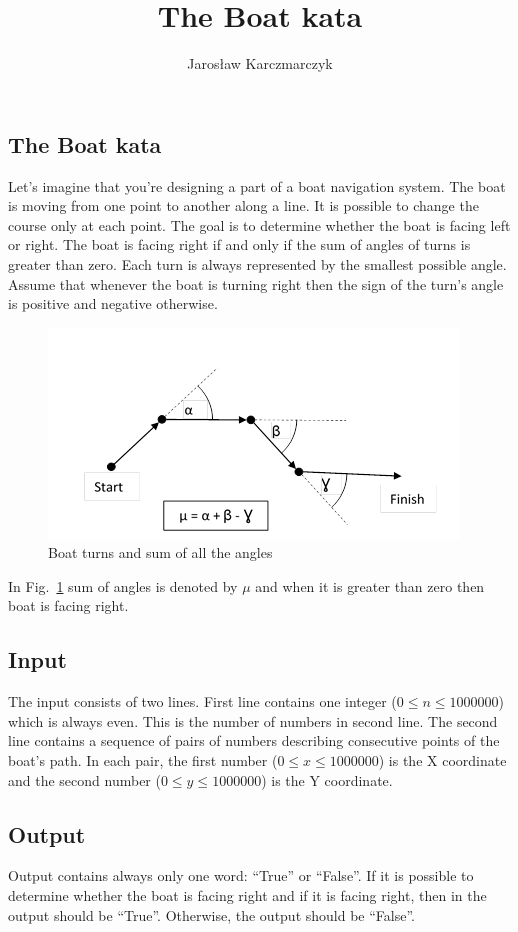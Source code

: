\documentclass{article}
\title{The Boat kata}
\author{Jarosław Karczmarczyk}
\date{}
\begin{document}
\pagestyle{empty}
\begin{center}
  \section*{The Boat kata}
\end{center}

\noindent Let’s imagine that you’re designing a part of a boat navigation system. The boat is moving from one point to another along a line. It is possible to change the course only at each point. The goal is to determine whether the boat is facing left or right. The boat is facing right if and only if the sum of angles of turns is greater than zero. Each turn is always represented by the smallest possible angle. Assume that whenever the boat is turning right then the sign of the turn's angle is positive and negative otherwise.
\begin{figure}[htpb]
\begin{center}
\includegraphics{boat_path.png}
\caption{Boat turns and sum of all the angles}
\label{fig:boat_path}
\end{center}
\end{figure}

\noindent In Fig.~\ref{fig:boat_path} sum of angles is denoted by $\mu$ and when it is greater than zero then boat is facing right. 

\subsection*{Input}
The input consists of two lines. First line contains one integer ($0 \leq n \leq 1000000$) which is always even. This is the number of numbers in second line. 
The second line contains a sequence of pairs of numbers describing consecutive points of the boat's path. In each pair, the first number ($0 \leq x \leq 1 000 000$) is the X coordinate and the second number ($0 \leq y \leq 1 000 000$) is the Y coordinate.

\subsection*{Output}
Output contains always only one word: ``True'' or ``False''.
If it is possible to determine whether the boat is facing right and if it is facing right, then in the output should be ``True''. Otherwise, the output should be ``False''.
\end{document}
